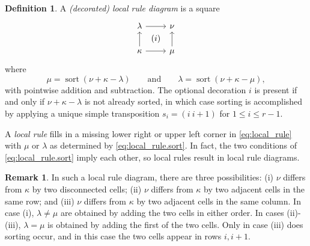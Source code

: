 \documentclass{amsart}
\theoremstyle{definition}
\newtheorem{definition}[theorem]{Definition}
\newtheorem{remark}[theorem]{Remark}
\DeclareMathOperator{\sort}{sort}
\begin{document}
\begin{definition}\label{def:local-rules}
  A \emph{(decorated) local rule diagram} is a square
  \begin{equation}\label{eq:local_rule}
  \begin{tikzcd}
  \lambda \ar{r}[name=U]{}
    & \nu \\
  \kappa \uar{} \ar{r}[swap,name=D]{}
    & \mu \ar{u}[swap]{}
  \ar[to path={(U) node[midway] {$(i)$}  (D)}]{}
  \end{tikzcd}
  \end{equation}
  where
  \begin{equation}\label{eq:local_rule.sort}
    \mu = \sort(\nu + \kappa - \lambda) \qquad\text{and}\qquad
      \lambda = \sort(\nu+\kappa-\mu),
  \end{equation}
  with pointwise addition and subtraction. The optional decoration $i$ is present if and only if $\nu + \kappa - \lambda$ is not already sorted, in which case sorting is accomplished by applying a unique simple transposition $s_i = (i\ i+1)$ for $1 \leq i \leq r-1$.

  A \emph{local rule} fills in a missing lower right or upper left corner in \eqref{eq:local_rule} with $\mu$ or $\lambda$ as determined by \eqref{eq:local_rule.sort}. In fact, the two conditions of \eqref{eq:local_rule.sort} imply each other, so local rules result in local rule diagrams.
\end{definition}

\begin{remark}\label{rem:sorting-cases}
    In such a local rule diagram, there are three possibilities: (i) $\nu$ differs from $\kappa$ by two disconnected cells; (ii) $\nu$ differs from $\kappa$ by two adjacent cells in the same row; and (iii) $\nu$ differs from $\kappa$ by two adjacent cells in the same column. In case (i), $\lambda \neq \mu$ are obtained by adding the two cells in either order. In cases (ii)-(iii), $\lambda = \mu$ is obtained by adding the first of the two cells. Only in case (iii) does sorting occur, and in this case the two cells appear in rows $i, i+1$.
\end{remark}
\end{document}
